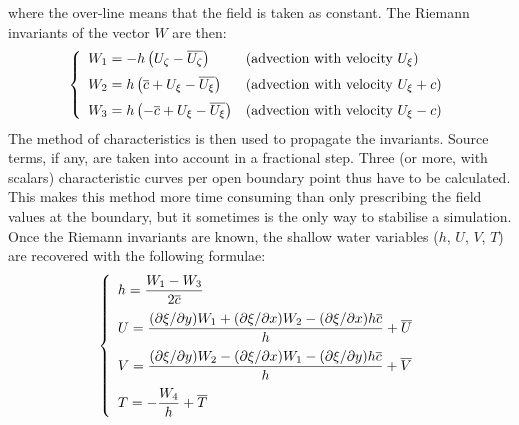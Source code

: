 where the over-line means that the field is taken as constant.
The Riemann invariants of the vector $W$ are then:
\begin{equation}
\left\{\begin{array}{ll}
W_1 = -h\left(U_\zeta - \overline{U_\zeta} \right) & \text{(advection with velocity $U_\xi$)}\medskip\\
W_2 = h\left(\overline{c}+U_\xi-\overline{U_\xi} \right) & \text{(advection with velocity $U_\xi+c$)}\medskip\\
W_3 = h\left(-\overline{c}+U_\xi-\overline{U_\xi} \right) & \text{(advection with velocity $U_\xi-c$)}
\end{array}\right.
\end{equation}
The method of characteristics is then used to propagate the invariants.
Source terms, if any, are taken into account in a fractional step.
Three (or more, with scalars) characteristic curves per open boundary point thus have to be
calculated. %
This makes this method more time consuming than only prescribing the field
values at the boundary, but it sometimes is the only way to stabilise a simulation.
Once the Riemann invariants are known, the shallow water variables ($h$, $U$, $V$, $T$) are recovered
with the following formulae:
\begin{equation}
\left\{\begin{array}{l}
h=\dfrac{W_1-W_3}{2\overline{c}} \medskip \\
U = \dfrac{(\partial \xi/\partial y)W_1+(\partial \xi/\partial x)W_2-(\partial \xi/\partial x)h\overline{c}}{h}+\overline{U} \medskip \\
V = \dfrac{(\partial \xi/\partial y)W_2-(\partial \xi/\partial x)W_1-(\partial \xi/\partial y)h\overline{c}}{h}+\overline{V} \medskip \\
T=-\dfrac{W_4}{h}+\overline{T}
\end{array}\right.
\end{equation}

